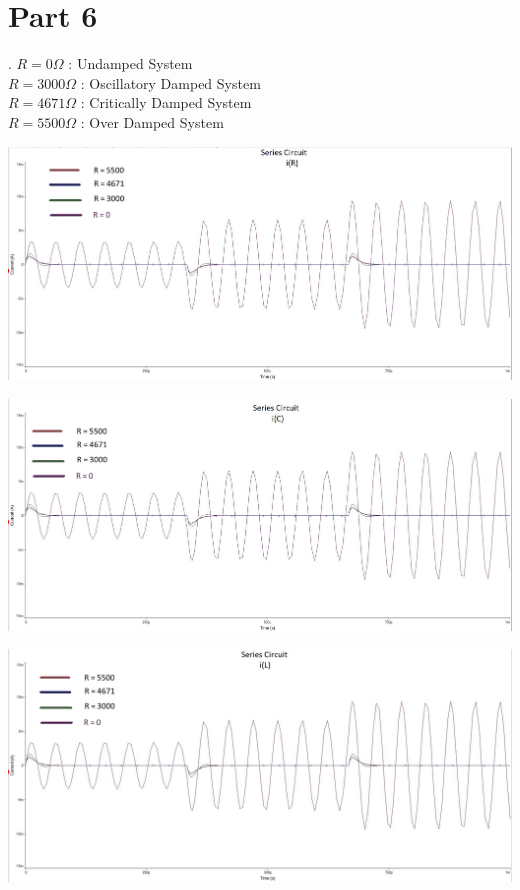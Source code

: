\documentclass[a4paper,twoside]{report}
\newenvironment{Figure}
  {\par\medskip\minipage{\linewidth}}
  {\endminipage\par\medskip}
\begin{document}
    \section*{Part 6}\setlength{\parindent}{0pt}.
        $R = 0\Omega$ : Undamped System \\
        $R = 3000\Omega$ : Oscillatory Damped System \\
        $R = 4671\Omega$ : Critically Damped System \\
        $R = 5500\Omega$ : Over Damped System
        \begin{center}
            \begin{Figure}
                \includegraphics[width=0.8\linewidth]{part6-resistor.jpg}
            \end{Figure}
            \begin{Figure}
                \includegraphics[width=0.8\linewidth]{part6-capacitor.jpg}
            \end{Figure}
            \begin{Figure}
                \includegraphics[width=0.8\linewidth]{part6-inductor.jpg}
            \end{Figure}
        \end{center}
\end{document}

